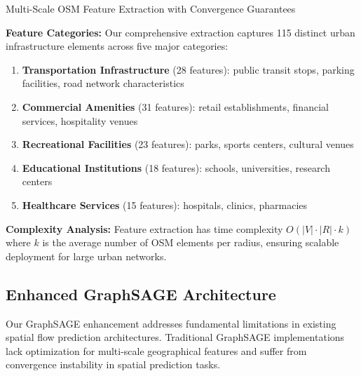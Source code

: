 \documentclass[twocolumn,11pt]{IEEEtran}  %
\begin{document}
\begin{algorithm}
\caption{Multi-Scale OSM Feature Extraction with Convergence Guarantees}
\label{alg:osm_extraction}
\begin{algorithmic}[1]
    \ENDFOR
\ENDFOR
{}
\end{algorithmic}
\end{algorithm}

\textbf{Feature Categories:} Our comprehensive extraction captures 115 distinct urban infrastructure elements across five major categories:
\begin{enumerate}
\item \textbf{Transportation Infrastructure} (28 features): public transit stops, parking facilities, road network characteristics
\item \textbf{Commercial Amenities} (31 features): retail establishments, financial services, hospitality venues
\item \textbf{Recreational Facilities} (23 features): parks, sports centers, cultural venues
\item \textbf{Educational Institutions} (18 features): schools, universities, research centers
\item \textbf{Healthcare Services} (15 features): hospitals, clinics, pharmacies
\end{enumerate}

\textbf{Complexity Analysis:} Feature extraction has time complexity $O(|V| \cdot |R| \cdot k)$ where $k$ is the average number of OSM elements per radius, ensuring scalable deployment for large urban networks.

\subsection{Enhanced GraphSAGE Architecture}

Our GraphSAGE enhancement addresses fundamental limitations in existing spatial flow prediction architectures. Traditional GraphSAGE implementations lack optimization for multi-scale geographical features and suffer from convergence instability in spatial prediction tasks.
\end{document}

